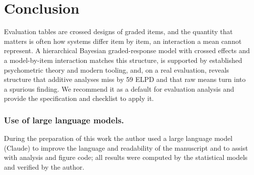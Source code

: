 \documentclass{llncs}
\begin{document}
\section{Conclusion}
Evaluation tables are crossed designs of graded items, and the quantity that
matters is often how systems differ item by item, an interaction a mean
cannot represent. A hierarchical Bayesian graded-response model with crossed
effects and a model-by-item interaction matches this structure, is supported
by established psychometric theory and modern tooling, and, on a real
evaluation, reveals structure that additive analyses miss by 59 ELPD and that
raw means turn into a spurious finding. We recommend it as a default for
evaluation analysis and provide the specification and checklist to apply it.

\subsubsection*{Use of large language models.}
During the preparation of this work the author used a large language model
(Claude) to improve the language and readability of the manuscript and to
assist with analysis and figure code; all results were computed by the
statistical models and verified by the author.

\printbibliography
\end{document}
